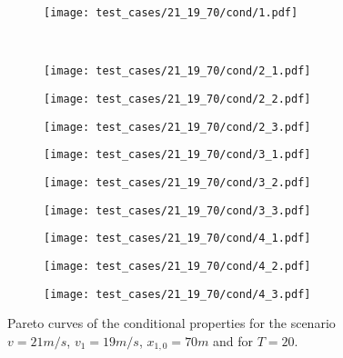 \begin{figure}[H]
\vspace{3em}
\centering
\begin{subfigure}{0.32\textwidth}
  \centering
  \texttt{[image: test\_cases/21\_19\_70/cond/1.pdf]}
\end{subfigure}\\
\begin{subfigure}{0.32\textwidth}
  \centering
  \texttt{[image: test\_cases/21\_19\_70/cond/2\_1.pdf]}
\end{subfigure} 
\begin{subfigure}{0.32\textwidth}
  \centering
  \texttt{[image: test\_cases/21\_19\_70/cond/2\_2.pdf]}
\end{subfigure}
\begin{subfigure}{0.32\textwidth}
  \centering
  \texttt{[image: test\_cases/21\_19\_70/cond/2\_3.pdf]}
\end{subfigure}
\begin{subfigure}{0.32\textwidth}
  \centering
  \texttt{[image: test\_cases/21\_19\_70/cond/3\_1.pdf]}
\end{subfigure}
\begin{subfigure}{0.32\textwidth}
  \centering
  \texttt{[image: test\_cases/21\_19\_70/cond/3\_2.pdf]}
\end{subfigure}
\begin{subfigure}{0.32\textwidth}
  \centering
  \texttt{[image: test\_cases/21\_19\_70/cond/3\_3.pdf]}
\end{subfigure}
\begin{subfigure}{0.32\textwidth}
  \centering
  \texttt{[image: test\_cases/21\_19\_70/cond/4\_1.pdf]}
\end{subfigure} 
\begin{subfigure}{0.32\textwidth}
  \centering
  \texttt{[image: test\_cases/21\_19\_70/cond/4\_2.pdf]}
\end{subfigure}
\begin{subfigure}{0.32\textwidth}
  \centering
  \texttt{[image: test\_cases/21\_19\_70/cond/4\_3.pdf]}
\end{subfigure}
\caption{Pareto curves of the conditional properties for the scenario $v = 21m/s$, $v_1 = 19m/s$, $x_{1,0} = 70m$ and for $T = 20$.}
\label{fig:test_case_1_cond}
\end{figure}

